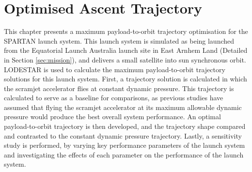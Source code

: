 
\cleardoublepage
\chapter{Optimised Ascent Trajectory}\label{chapter:Ascent}
	
	


	
This chapter presents a maximum payload-to-orbit trajectory optimisation for the SPARTAN launch system. 
This launch system is simulated as being launched from the Equatorial Launch Australia launch site in East Arnhem Land (Detailed in Section \ref{sec:mission}), and delivers a small satellite into sun synchronous orbit. LODESTAR is used to calculate the maximum payload-to-orbit trajectory solutions for this launch system.
First, a trajectory solution is calculated in which the scramjet accelerator flies at constant dynamic pressure. This trajectory is calculated to serve as a baseline for comparisons, as previous studies have assumed that flying the scramjet accelerator at its maximum allowable dynamic pressure would produce the best overall system performance\cite{Preller2017b}. An optimal payload-to-orbit trajectory is then developed, and the trajectory shape compared and contrasted to the constant dynamic pressure trajectory.
Lastly, a sensitivity study is performed, by varying key performance parameters of the launch system and investigating the effects of each parameter on the performance of the launch system. 

